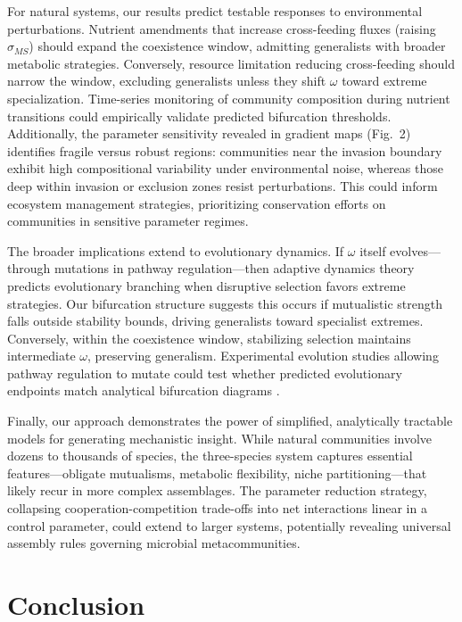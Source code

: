 \documentclass[9pt,twocolumn]{pnas-new}
\begin{document}
For natural systems, our results predict testable responses to environmental perturbations. Nutrient amendments that increase cross-feeding fluxes (raising $\sigma_{MS}$) should expand the coexistence window, admitting generalists with broader metabolic strategies. Conversely, resource limitation reducing cross-feeding should narrow the window, excluding generalists unless they shift $\omega$ toward extreme specialization. Time-series monitoring of community composition during nutrient transitions could empirically validate predicted bifurcation thresholds. Additionally, the parameter sensitivity revealed in gradient maps (Fig.~2) identifies fragile versus robust regions: communities near the invasion boundary exhibit high compositional variability under environmental noise, whereas those deep within invasion or exclusion zones resist perturbations. This could inform ecosystem management strategies, prioritizing conservation efforts on communities in sensitive parameter regimes.

The broader implications extend to evolutionary dynamics. If $\omega$ itself evolves—through mutations in pathway regulation—then adaptive dynamics theory \cite{geritz1998evolutionarily} predicts evolutionary branching when disruptive selection favors extreme strategies. Our bifurcation structure suggests this occurs if mutualistic strength falls outside stability bounds, driving generalists toward specialist extremes. Conversely, within the coexistence window, stabilizing selection maintains intermediate $\omega$, preserving generalism. Experimental evolution studies allowing pathway regulation to mutate could test whether predicted evolutionary endpoints match analytical bifurcation diagrams \cite{good2017dynamics,lee2019rate}.

Finally, our approach demonstrates the power of simplified, analytically tractable models for generating mechanistic insight. While natural communities involve dozens to thousands of species, the three-species system captures essential features—obligate mutualisms, metabolic flexibility, niche partitioning—that likely recur in more complex assemblages. The parameter reduction strategy, collapsing cooperation-competition trade-offs into net interactions linear in a control parameter, could extend to larger systems, potentially revealing universal assembly rules governing microbial metacommunities.

\section*{Conclusion}
\end{document}
